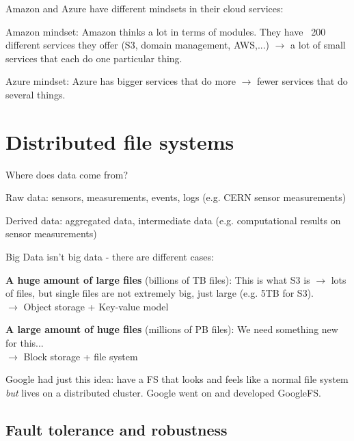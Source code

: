 \documentclass[11pt,oneside,a4paper]{article}
\begin{document}
Amazon and Azure have different mindsets in their cloud services:

\begin{compactitem}
	\item Amazon mindset: Amazon thinks a lot in terms of modules. They have ~200 different services they offer (S3, domain management, AWS,...) $\rightarrow$ a lot of small services that each do one particular thing.
	\item Azure mindset: Azure has bigger services that do more $\rightarrow$ fewer services that do several things.\\
\end{compactitem}

\section{Distributed file systems}

Where does data come from?

\begin{compactitem}
	\item Raw data: sensors, measurements, events, logs (e.g. CERN sensor measurements)
	\item Derived data: aggregated data, intermediate data (e.g. computational results on sensor measurements)
\end{compactitem}

Big Data isn't big data - there are different cases:

\begin{compactitem}
	\item \textbf{A	huge amount of large files} (billions of TB files): This is what S3 is $\rightarrow$ lots of files, but single files are not extremely big, just large (e.g. 5TB for S3).\\
	$\rightarrow$ Object storage + Key-value model
	\item \textbf{A large amount of huge files} (millions of PB files): We need something new for this...\\
	$\rightarrow$ Block storage + file system
\end{compactitem}

Google had just this idea: have a FS that looks and feels like a normal file system \textit{but} lives on a distributed cluster. Google went on and developed GoogleFS.

\subsection{Fault tolerance and robustness}
\end{document}
